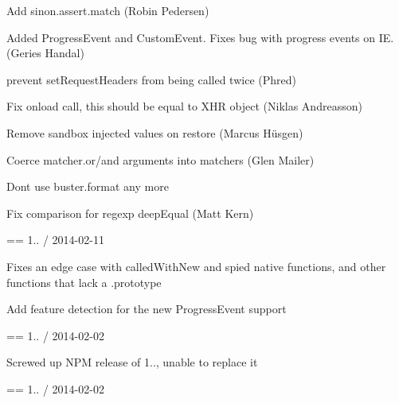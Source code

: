 \begin{DoxyItemize}
\item Add sinon.\+assert.\+match (Robin Pedersen)
\item Added Progress\+Event and Custom\+Event. Fixes bug with progress events on IE. (Geries Handal)
\item prevent set\+Request\+Headers from being called twice (Phred)
\item Fix onload call, \textquotesingle{}this\textquotesingle{} should be equal to X\+HR object (Niklas Andreasson)
\item Remove sandbox injected values on restore (Marcus Hüsgen)
\item Coerce matcher.\+or/and arguments into matchers (Glen Mailer)
\item Don\textquotesingle{}t use buster.\+format any more
\item Fix comparison for regexp deep\+Equal (Matt Kern)
\end{DoxyItemize}

== 1.. / 2014-\/02-\/11


\begin{DoxyItemize}
\item Fixes an edge case with called\+With\+New and spied native functions, and other functions that lack a .prototype
\item Add feature detection for the new Progress\+Event support
\end{DoxyItemize}

== 1.. / 2014-\/02-\/02


\begin{DoxyItemize}
\item Screwed up N\+PM release of 1.., unable to replace it
\end{DoxyItemize}

== 1.. / 2014-\/02-\/02


